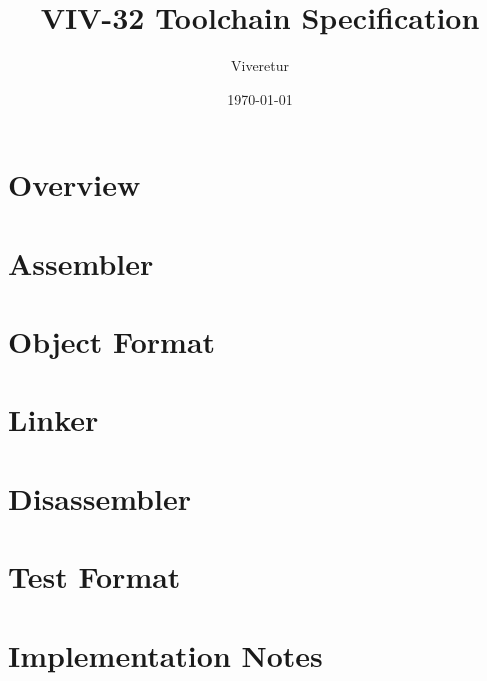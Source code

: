 \documentclass[11pt,a4paper]{report}
\title{VIV-32 Toolchain Specification}
\author{Viveretur}
\date{\today}
\begin{document}
\maketitle

\tableofcontents
\clearpage

\chapter{Overview}


\chapter{Assembler}


\chapter{Object Format}


\chapter{Linker}


\chapter{Disassembler}


\chapter{Test Format}


\chapter{Implementation Notes}

\end{document}
